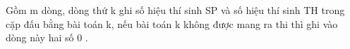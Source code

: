 Gồm m dòng, dòng thứ k ghi số hiệu thí sinh SP và số hiệu thí sinh TH trong cặp đấu bằng bài toán k, nếu bài toán k không được mang ra thi thì ghi vào dòng này hai số 0 .  

\